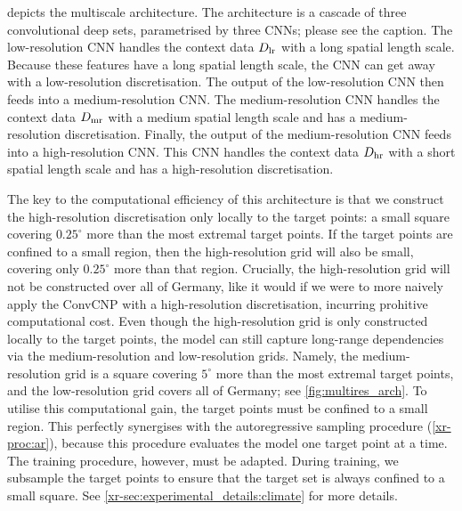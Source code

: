 \documentclass[12pt, twoside]{report}
\newcommand{\xrprefix}[1]{xr-#1}
\begin{document}
 depicts the multiscale architecture.
The architecture is a cascade of three convolutional deep sets, parametrised by three CNNs;
please see the caption.
The low-resolution CNN handles the context data $D\ss{lr}$ with a long spatial length scale.
Because these features have a long spatial length scale, the CNN can get away with a low-resolution discretisation.
The output of the low-resolution CNN then feeds into a medium-resolution CNN.
The medium-resolution CNN handles the context data $D\ss{mr}$ with a medium spatial length scale and has a medium-resolution discretisation.
Finally, the output of the medium-resolution CNN feeds into a high-resolution CNN.
This CNN handles the context data $D\ss{hr}$ with a short spatial length scale and has a high-resolution discretisation.

The key to the computational efficiency of this architecture is that we construct the high-resolution discretisation
only locally to the target points: a small square covering $0.25^\circ$ more than the most extremal target points.
If the target points are confined to a small region, then the high-resolution grid will also be small, covering only $0.25^\circ$ more than that region.
Crucially, the high-resolution grid will not be constructed over all of Germany, like it would if we were to more naively apply the ConvCNP with a high-resolution discretisation, incurring prohitive computational cost.
Even though the high-resolution grid is only constructed locally to the target points, the model can still capture long-range dependencies via the medium-resolution and low-resolution grids.
Namely, the medium-resolution grid is a square covering $5^\circ$ more than the most extremal target points, and the low-resolution grid covers all of Germany; see \cref{fig:multires_arch}.
To utilise this computational gain, the target points must be confined to a small region.
This perfectly synergises with the autoregressive sampling procedure (\cref{\xrprefix{proc:ar}}),
because this procedure evaluates the model one target point at a time.
The training procedure, however, must be adapted.
During training, we subsample the target points to ensure that the target set is always confined to a small square.
See \cref{\xrprefix{sec:experimental_details:climate}} for more details.
\end{document}
